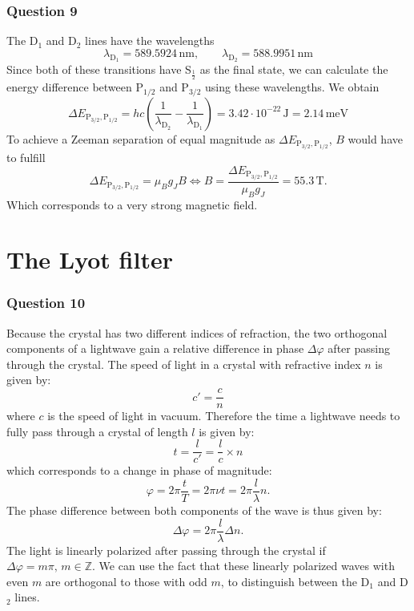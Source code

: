 \subsubsection{Question 9}\label{subsec:Question9}
The D$_1$ and D$_2$ lines have the wavelengths
\begin{equation}
	\lambda_{\mathrm D_1}= 589.5924 \,\si{\nano\metre}, \qquad \lambda_{\mathrm D_2}=588.9951 \,\si{\nano\metre}
\end{equation}
Since both of these transitions have S$_\frac{1}{2}$ as the final state, we can calculate the energy difference between P$_{1/2}$ and P$_{3/2}$ using these wavelengths. We obtain
\begin{equation}
	\Delta E_{\mathrm P_{3/2},\mathrm P_{1/2}} =hc\left(	\frac{1}{\lambda_{\mathrm D_2}}-		\frac{1}{\lambda_{\mathrm D_1}}\right)=3.42\cdot 10^{-22} \, \si{\joule}=2.14 \, \si{\milli\electronvolt} \label{eq:energiedifferenz}
\end{equation}
To achieve a Zeeman separation of equal magnitude as $	\Delta E_{\mathrm P_{3/2},\mathrm P_{1/2}}$, $B$ would have to fulfill
\begin{equation}	\Delta E_{\mathrm P_{3/2},\mathrm P_{1/2}}=\mu_Bg_JB\Leftrightarrow B=\frac{	\Delta E_{\mathrm P_{3/2},\mathrm P_{1/2}}}{\mu_Bg_J}=55.3 \, \si{\tesla}.\end{equation}
Which corresponds to a very strong magnetic field.
\section{The Lyot filter}
\subsubsection{Question 10}
Because the crystal has two different indices of refraction, the two orthogonal components of a lightwave gain a relative difference in phase $\Delta \varphi$ after passing through the crystal. The speed of light in a crystal with refractive index $n$ is given by:
\begin{equation}
	c'=\frac{c}{n}
\end{equation}
where $c$ is the speed of light in vacuum. Therefore the time a lightwave needs  to fully pass through a crystal of length $l$ is given by:
\begin{equation}
	t=\frac{l}{c'}=\frac{l}{c}\times n
\end{equation} 
which corresponds to a change  in phase of magnitude:
\begin{equation}
	\varphi=2\pi \frac{t}{T}=2\pi\nu t=2\pi \frac{l}{\lambda}n.
\end{equation}
The phase difference between both components of the wave is thus given by:
\begin{equation}
	\Delta\varphi=2\pi \frac{l}{\lambda}\Delta n.
\end{equation}
The light is linearly polarized after passing through the crystal if $\Delta\varphi= m \pi, \, m\in \mathbb Z$. We  can use the fact that these linearly polarized waves with even $m$ are orthogonal to those with odd $m$, to distinguish between the D$_1$ and D$_2$ lines.


